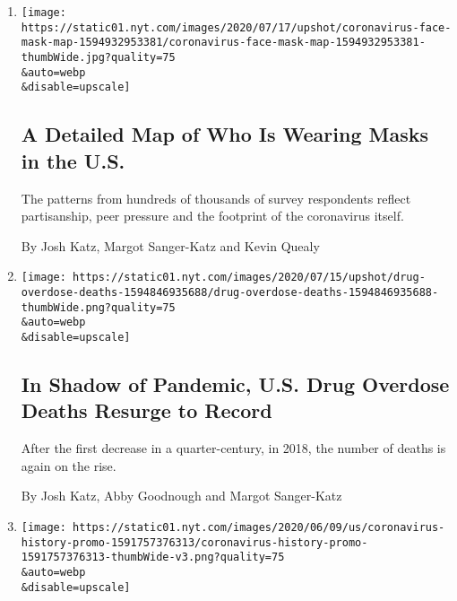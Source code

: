 \begin{enumerate}
\def\labelenumi{\arabic{enumi}.}
\item
  \href{/interactive/2020/07/17/upshot/coronavirus-face-mask-map.html}{}

  \texttt{[image: https://static01.nyt.com/images/2020/07/17/upshot/coronavirus-face-mask-map-1594932953381/coronavirus-face-mask-map-1594932953381-thumbWide.jpg?quality=75\\\&auto=webp\\\&disable=upscale]}

  \hypertarget{a-detailed-map-of-who-is-wearing-masks-in-the-us}{%
  \subsection{A Detailed Map of Who Is Wearing Masks in the
  U.S.}\label{a-detailed-map-of-who-is-wearing-masks-in-the-us}}

  The patterns from hundreds of thousands of survey respondents reflect
  partisanship, peer pressure and the footprint of the coronavirus
  itself.

  By Josh Katz, Margot Sanger-Katz and Kevin Quealy
\item
  \href{/interactive/2020/07/15/upshot/drug-overdose-deaths.html}{}

  \texttt{[image: https://static01.nyt.com/images/2020/07/15/upshot/drug-overdose-deaths-1594846935688/drug-overdose-deaths-1594846935688-thumbWide.png?quality=75\\\&auto=webp\\\&disable=upscale]}

  \hypertarget{in-shadow-of-pandemic-us-drug-overdose-deaths-resurge-to-record}{%
  \subsection{In Shadow of Pandemic, U.S. Drug Overdose Deaths Resurge
  to
  Record}\label{in-shadow-of-pandemic-us-drug-overdose-deaths-resurge-to-record}}

  After the first decrease in a quarter-century, in 2018, the number of
  deaths is again on the rise.

  By Josh Katz, Abby Goodnough and Margot Sanger-Katz
\item
  \href{/interactive/2020/06/10/world/coronavirus-history.html}{}

  \texttt{[image: https://static01.nyt.com/images/2020/06/09/us/coronavirus-history-promo-1591757376313/coronavirus-history-promo-1591757376313-thumbWide-v3.png?quality=75\\\&auto=webp\\\&disable=upscale]}

  \hypertarget{how-the-coronavirus-compares-with-100-years-of-deadly-events}{%
}
\end{enumerate}
